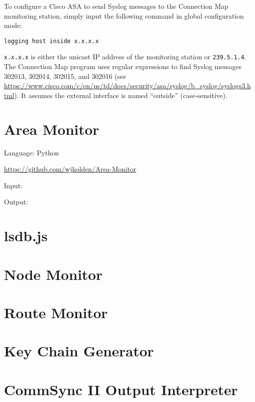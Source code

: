 \documentclass[12pt]{article}
\begin{document}
To configure a Cisco ASA to send Syslog messages to the Connection Map monitoring station, simply input the following command in global configuration mode:

\begin{lstlisting}
logging host inside x.x.x.x
\end{lstlisting}

\texttt{x.x.x.x} is either the unicast IP address of the monitoring station or \texttt{239.5.1.4}. The Connection Map program uses regular expressions to find Syslog messages 302013, 302014, 302015, and 302016 (see \url{https://www.cisco.com/c/en/us/td/docs/security/asa/syslog/b_syslog/syslogs3.html}). It assumes the external interface is named ``outside'' (case-sensitive).

\section{Area Monitor}

Language: Python

\url{https://github.com/wjholden/Area-Monitor}

Input: 

Output: 

\section{lsdb.js}

\section{Node Monitor}

\section{Route Monitor}

\section{Key Chain Generator}

\section{CommSync II Output Interpreter}
\end{document}
